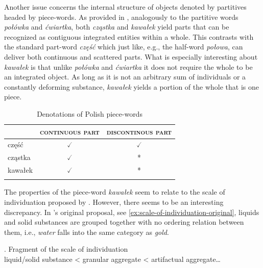 Another issue concerns the internal structure of objects denoted by partitives headed by piece-words. As provided in  , analogously to the partitive words \textit{połówka} and \textit{ćwiartka}, both \textit{cząstka} and \textit{kawałek} yield parts that can be recognized as contiguous integrated entities within a whole. This contrasts with the standard part-word \textit{część} which just like, e.g., the half-word \textit{połowa}, can deliver both continuous and scattered parts. What is especially interesting about \textit{kawałek} is that unlike \textit{połówka} and \textit{ćwiartka} it does not require the whole to be an integrated object. As long as it is not an arbitrary sum of individuals or a constantly deforming substance, \textit{kawałek} yields a portion of the whole that is one piece.

\begin{table}[h]
			\centering
			\begin{tabular}{lcc}
				\lsptoprule
				& \textsc{continuous part} & \textsc{discontinous part} \\ \midrule
                część    & $\checked$    & $\checked$      \\				
                cząstka     & $\checked$    & *      \\
				kawałek & $\checked$    & *                 \\ \lspbottomrule
			\end{tabular}
			\caption{Denotations of Polish piece-words}\label{tab:denotations-of-polish-piece-words}
		\end{table}

The properties of the piece-word \textit{kawałek} seem to relate to the scale of individuation proposed by \citet{grimm2012number}. However, there seems to be an interesting discrepancy. In \citeauthor{grimm2012number}'s original proposal, see \ref{ex:scale-of-individuation-original}, liquids and solid substances are grouped together with no ordering relation between them, i.e., \textit{water} falls into the same category as \textit{gold}. 

\ex. Fragment of the scale of individuation \citep[p. 80; adapted]{grimm2012number}\\
liquid/solid substance < granular aggregate < artifactual aggregate\dots\label{ex:scale-of-individuation}\label{ex:scale-of-individuation-original}

